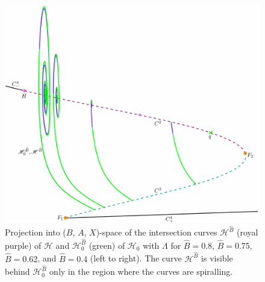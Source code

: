 \documentclass{ws-ijbc}
\begin{document}
\begin{figure}[H]
\centering
\includegraphics[]{./figures/MKMO_20.pdf}
\caption{Projection into ($B$, $A$, $X$)-space of the intersection curves $\mathscr{H}^{\widehat{B}}$ (royal purple) of $\mathscr{H}$ and $\mathscr{H}_0^{\widehat{B}}$ (green) of $\mathscr{H}_0$ with $\Lambda$ for $\widehat{B}=0.8$, $\widehat{B}=0.75$, $\widehat{B}=0.62$, and $\widehat{B}=0.4$ (left to right).  The curve $\mathscr{H}^{\widehat{B}}$ is visible behind $\mathscr{H}^{\widehat{B}}_0$ only in the region where the curves are spiralling.}
\label{figure_20}
\end{figure}
\end{document}

